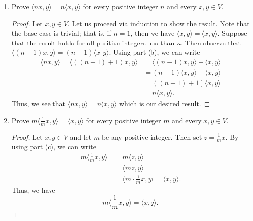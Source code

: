 \documentclass[a4paper]{article}
\begin{document}
\begin{enumerate}
    \item[(c)] Prove \( \langle nx , y \rangle = n \langle x  , y \rangle  \) for every positive integer \( n  \) and every \( x,y \in V  \). 
        \begin{proof}
        Let \( x ,y \in V  \). Let us proceed via induction to show the result. Note that the base case is trivial; that is, if \( n = 1  \), then we have \( \langle x , y \rangle = \langle x , y \rangle \). Suppose that the result holds for all positive integers less than \( n  \). Then observe that \( \langle (n-1)x , y \rangle = (n-1) \langle x , y \rangle \). Using part (b), we can write
        \begin{align*}
            \langle nx , y \rangle = \langle (  (n-1) + 1  ) x , y \rangle &= \langle (n-1) x , y \rangle + \langle x , y \rangle   \\
                                                                           &= (n-1) \langle x , y \rangle + \langle x , y \rangle \\ 
                                                                           &= ((n-1) + 1) \langle x , y \rangle \\
                                                                           &= n \langle x , y \rangle.
        \end{align*}
        Thus, we see that \( \langle nx , y \rangle = n \langle x , y \rangle \) which is our desired result.
        \end{proof}
    \item[(d)] Prove \( m \langle \frac{ 1 }{ m }  x  , y \rangle = \langle x , y \rangle \) for every positive integer \( m  \) and every \( x,y \in V  \).
        \begin{proof}
        Let \( x,y \in V \) and let \( m  \) be any positive integer. Then set \( z = \frac{ 1 }{ m }  x  \). By using part (c), we can write
        \begin{align*}
            m \Big\langle \frac{ 1 }{ m }  x  , y \Big\rangle &= m \Big\langle z  , y \Big\rangle \\
                                                      &= \langle mz , y \rangle \\
                                                      &= \Big\langle m \cdot \frac{ 1 }{ m }  x  , y \Big\rangle = \langle x  , y \rangle.
        \end{align*}
        Thus, we have 
        \[  m \Big\langle  \frac{ 1 }{ m }  x  , y \Big\rangle = \langle x , y \rangle. \]
        \end{proof}

\end{enumerate}
\end{document}
